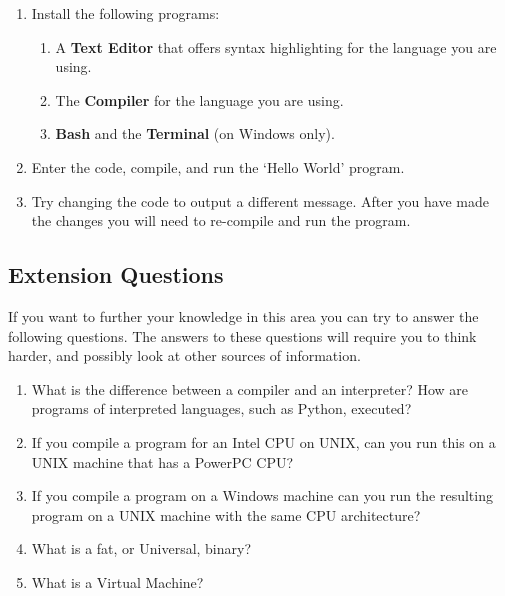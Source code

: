 \begin{enumerate}
  \item Install the following programs:
  \begin{enumerate}
    \item A \textbf{Text Editor} that offers syntax highlighting for the language you are using.
    \item The \textbf{Compiler} for the language you are using.
    \item \textbf{Bash} and the \textbf{Terminal} (on Windows only).
  \end{enumerate}
  \item Enter the code, compile, and run the `Hello World' program.
  \item Try changing the code to output a different message. After you have made the changes you will need to re-compile and run the program.
\end{enumerate}

\clearpage
\subsection{Extension Questions} %
\label{sub:extension_questions_compiler}

If you want to further your knowledge in this area you can try to answer the following questions. The answers to these questions will require you to think harder, and possibly look at other sources of information.
\begin{enumerate}
  \item What is the difference between a compiler and an interpreter? How are programs of interpreted languages, such as Python, executed?
  \item If you compile a program for an Intel CPU on UNIX, can you run this on a UNIX machine that has a PowerPC CPU?
  \item If you compile a program on a Windows machine can you run the resulting program on a UNIX machine with the same CPU architecture?
  \item What is a fat, or Universal, binary?
  \item What is a Virtual Machine?
\end{enumerate}


